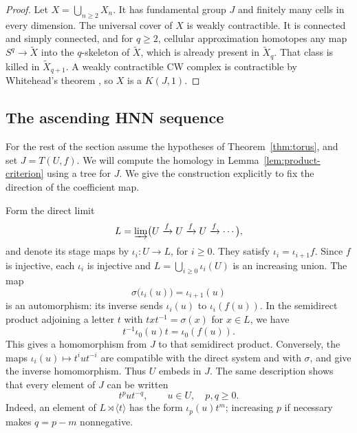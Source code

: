 \begin{proof}
Let $X=\bigcup_{n\ge2}X_n$.  It has fundamental group $J$ and
finitely many cells in every dimension.  The universal cover of
$X$ is weakly contractible.  It is connected and simply connected, and
for $q\ge2$, cellular approximation \cite[Theorem~4.8]{Hatcher2002}
homotopes any map $S^q\to\widetilde X$ into the $q$-skeleton of
$\widetilde X$, which is already present in $\widetilde X_q$.  That
class is killed in
$\widetilde X_{q+1}$.  A weakly
contractible CW complex is contractible by Whitehead's theorem
\cite[Theorem~4.5]{Hatcher2002}, so $X$ is a $K(J,1)$.
\end{proof}

\subsection{The ascending HNN sequence}

For the rest of the section assume the hypotheses of
Theorem~\ref{thm:torus}, and set $J=T(U,f)$.  We will compute the
homology in Lemma~\ref{lem:product-criterion} using a tree for $J$.
We give the construction explicitly to fix the direction of the
coefficient map.

Form the direct limit
\[
 L=\varinjlim\bigl(U\xrightarrow{f}U\xrightarrow{f}U
          \xrightarrow{f}\cdots\bigr),
\]
and denote its stage maps by $\iota_i:U\to L$, for $i\ge0$.
They satisfy $\iota_i=\iota_{i+1}f$.  Since $f$ is injective,
each $\iota_i$ is injective and
$L=\bigcup_{i\ge0}\iota_i(U)$ is an increasing union.  The map
\[
 \sigma\bigl(\iota_i(u)\bigr)=\iota_{i+1}(u)
\]
is an automorphism: its inverse sends $\iota_i(u)$ to
$\iota_i(f(u))$.  In the semidirect product adjoining a letter
$t$ with $t x t^{-1}=\sigma(x)$ for $x\in L$, we have
\[
 t^{-1}\iota_0(u)t=\iota_0(f(u)).
\]
This gives a homomorphism from $J$ to that semidirect product.
Conversely, the maps $\iota_i(u)\mapsto t^iut^{-i}$ are compatible
with the direct system and with $\sigma$, and give the inverse
homomorphism.  Thus $U$ embeds in $J$.  The same description shows
that every element of $J$ can be written
\begin{equation}\label{eq:ascending-normal-form}
 t^p u t^{-q},\qquad u\in U,\quad p,q\ge0.
\end{equation}
Indeed, an element of $L\rtimes\langle t\rangle$ has the form
$\iota_p(u)t^m$; increasing $p$ if necessary makes $q=p-m$
nonnegative.

